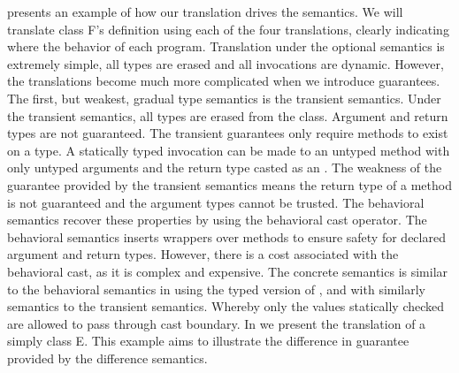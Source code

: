 \documentclass[runnningheads]{tex/llncs}
\begin{document}
 presents an example of how our translation drives the
semantics.  We will translate class {\xt F}'s definition using each of the
four translations, clearly indicating where the behavior of each program.
Translation under the optional semantics is extremely simple, all types are
erased and all invocations are dynamic. However, the translations become
much more complicated when we introduce guarantees.  The first, but weakest,
gradual type semantics is the transient semantics. Under the transient
semantics, all types are erased from the class.  Argument and return types
are not guaranteed. The transient guarantees only require methods to exist
on a type. A statically typed invocation can be made to an untyped method \m
with only untyped arguments and the return type casted as an \any.  The
weakness of the guarantee provided by the transient semantics means the
return type of a method is not guaranteed and the argument types cannot be
trusted. The behavioral semantics recover these properties by using the
behavioral cast operator. The behavioral semantics inserts wrappers over
methods to ensure safety for declared argument and return types.  However,
there is a cost associated with the behavioral cast, as it is complex and
expensive.  The concrete semantics is similar to the behavioral semantics in
using the typed version of \m, and with similarly semantics to the transient
semantics. Whereby only the values statically checked are allowed to pass
through cast boundary.  In  we present the translation
of a simply class {\xt E}. This example aims to illustrate the difference in
guarantee provided by the difference semantics.
\end{document}
